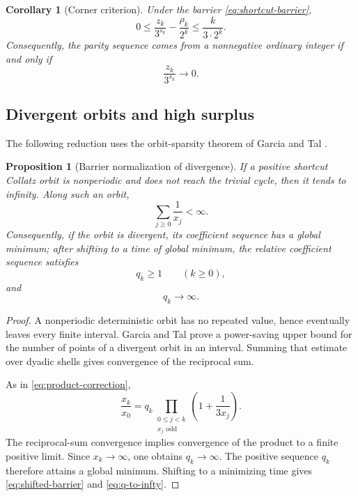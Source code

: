 \documentclass[11pt,reqno]{amsart}
\numberwithin{equation}{section}
\newtheorem{proposition}[theorem]{Proposition}
\newtheorem{corollary}[theorem]{Corollary}
\theoremstyle{definition}
\theoremstyle{remark}
\begin{document}
\begin{corollary}[Corner criterion]\label{cor:corner-criterion}
Under the barrier \eqref{eq:shortcut-barrier},
\begin{equation}\label{eq:corner-bound}
0\le
\frac{z_k}{3^{s_k}}-\frac{\rho_k}{2^k}
\le
\frac{k}{3\cdot2^k}.
\end{equation}
Consequently, the parity sequence comes from a nonnegative ordinary integer
if and only if
\begin{equation}\label{eq:corner-limit}
\frac{z_k}{3^{s_k}}\longrightarrow0.
\end{equation}
\end{corollary}

\subsection{Divergent orbits and high surplus}

The following reduction uses the orbit-sparsity theorem of Garcia and Tal
\cite{GarciaTal1999}.

\begin{proposition}[Barrier normalization of divergence]\label{prop:barrier-normalization}
If a positive shortcut Collatz orbit is nonperiodic and does not reach the
trivial cycle, then it tends to infinity.  Along such an orbit,
\[
\sum_{j\ge0}\frac1{x_j}<\infty.
\]
Consequently, if the orbit is divergent, its coefficient sequence has a
global minimum; after shifting to a time of global minimum, the relative
coefficient sequence satisfies
\begin{equation}\label{eq:shifted-barrier}
q_k\ge1
\qquad(k\ge0),
\end{equation}
and
\begin{equation}\label{eq:q-to-infty}
q_k\longrightarrow\infty.
\end{equation}
\end{proposition}

\begin{proof}
A nonperiodic deterministic orbit has no repeated value, hence eventually
leaves every finite interval.  Garcia and Tal prove a power-saving upper
bound for the number of points of a divergent orbit in an interval.  Summing
that estimate over dyadic shells gives convergence of the reciprocal sum.

As in \eqref{eq:product-correction},
\[
\frac{x_k}{x_0}
=q_k
\prod_{\substack{0\le j<k\\x_j\text{ odd}}}
\left(1+\frac1{3x_j}\right).
\]
The reciprocal-sum convergence implies convergence of the product to a
finite positive limit.  Since $x_k\to\infty$, one obtains $q_k\to\infty$.
The positive sequence $q_k$ therefore attains a global minimum.  Shifting to
a minimizing time gives \eqref{eq:shifted-barrier} and
\eqref{eq:q-to-infty}.
\end{proof}
\end{document}
